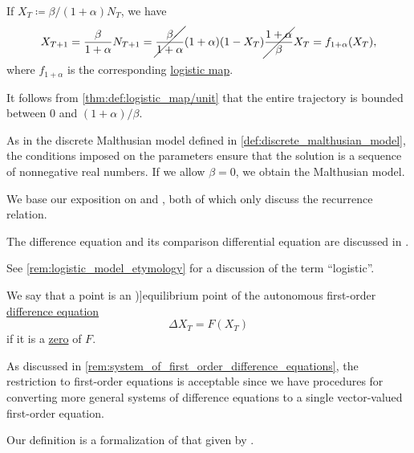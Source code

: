\begin{comments}
  \item If \( X_T \coloneqq \beta / (1 + \alpha) N_T \), we have
  \begin{equation*}
    X_{T+1}
    =
    \frac \beta {1 + \alpha} N_{T+1}
    =
    \cancel{\frac \beta {1 + \alpha}} (1 + \alpha) (1 - X_T) \cancel{\frac {1 + \alpha} \beta} X_T
    =
    f_{1 + \alpha}(X_T),
  \end{equation*}
  where \( f_{1 + \alpha} \) is the corresponding \hyperref[def:logistic_map]{logistic map}.

  It follows from \cref{thm:def:logistic_map/unit} that the entire trajectory is bounded between \( 0 \) and \( (1 + \alpha) / \beta \).

  \item As in the discrete Malthusian model defined in \cref{def:discrete_malthusian_model}, the conditions imposed on the parameters ensure that the solution is a sequence of nonnegative real numbers. If we allow \( \beta = 0 \), we obtain the Malthusian model.

  \item We base our exposition on \cite[18]{Юмагулов2015ДинамическиеСистемы} and \cite[45]{EdelsteinKeshet2005MathematicalModelsInBiology}, both of which only discuss the recurrence relation.

  The difference equation and its comparison differential equation are discussed in \cite{MathSE:discrete_vs_continuous_logistic_model}.

  \item See \cref{rem:logistic_model_etymology} for a discussion of the term \enquote{logistic}.
\end{comments}

\begin{definition}\label{def:difference_equation_equilibrium_point}\mimprovised
  We say that a point is an \term[en=equilibrium points (\cite[15]{Elaydi2007DiscreteChaos})]{equilibrium point} of the autonomous first-order \hyperref[def:difference_equation]{difference equation}
  \begin{equation*}
    \Delta X_T = F(X_T)
  \end{equation*}
  if it is a \hyperref[def:zero_of_function]{zero} of \( F \).
\end{definition}
\begin{comments}
  \item As discussed in \cref{rem:system_of_first_order_difference_equations}, the restriction to first-order equations is acceptable since we have procedures for converting more general systems of difference equations to a single vector-valued first-order equation.

  \item Our definition is a formalization of that given by \textcite[15]{Elaydi2007DiscreteChaos}.
\end{comments}

